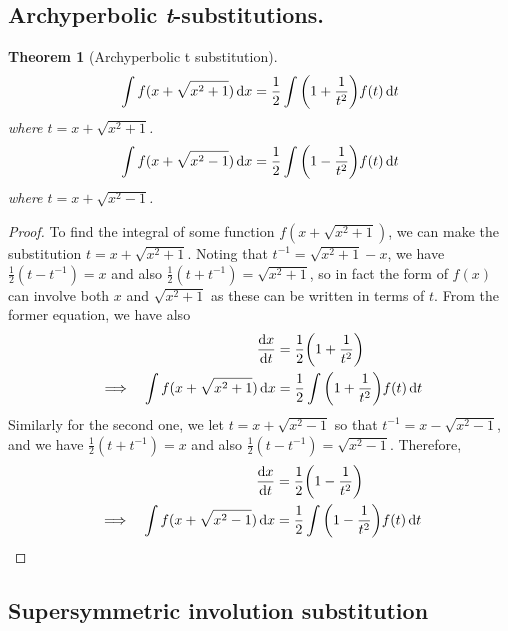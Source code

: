 \documentclass[fleqn,a4paper,11pt]{article}
\newtheorem{theorem}{Theorem}[section]
\begin{document}
    \subsection{Archyperbolic \textit t-substitutions.}

    \begin{theorem}[Archyperbolic t substitution]
    \begin{equation*}
    \int f(x + \sqrt{x^2 + 1}) \dd{x}
        = \frac 12 \int \pqty{1 + \frac 1{t^2}}f(t) \dd{t}
    \end{equation*}
    where \(t = x + \sqrt{x^2 + 1}\).
    \begin{equation*}
    \int f(x + \sqrt{x^2 - 1}) \dd{x}
        = \frac 12 \int \pqty{1 - \frac 1{t^2}}f(t) \dd{t}
    \end{equation*}
    where \(t = x + \sqrt{x^2 - 1}\).
    \end{theorem}
    \begin{proof}
    To find the integral of some function \(f(x + \sqrt{x^2 + 1})\), we can make
    the substitution \(t = x + \sqrt{x^2 + 1}\). Noting that
    \(t^{-1} = \sqrt{x^2 + 1} - x\), we have \(\frac 12(t - t^{-1}) = x\)
    and also \(\frac 12(t + t^{-1}) = \sqrt{x^2 + 1}\), so in fact the form of
    \(f(x)\) can involve both \(x\) and \(\sqrt{x^2 + 1}\) as these can be
    written in terms of \(t\). From the former equation, we have also
    \begin{alignat*}{2}
    && \dv{x}{t} &= \frac 12\pqty{1 + \frac 1{t^2}} \\
    &\implies& \int f(x + \sqrt{x^2 + 1}) \dd{x}
        &= \frac 12 \int \pqty{1 + \frac 1{t^2}}f(t) \dd{t}
    \end{alignat*}
    Similarly for the second one, we let \(t = x + \sqrt{x^2 - 1}\) so that
    \(t^{-1} = x - \sqrt{x^2 - 1}\), and we have \(\frac 12(t + t^{-1}) = x\)
    and also \(\frac 12(t - t^{-1}) = \sqrt{x^2 - 1}\). Therefore,
    \begin{alignat*}{2}
    && \dv{x}{t} &= \frac 12\pqty{1 - \frac 1{t^2}} \\
    &\implies& \int f(x + \sqrt{x^2 - 1}) \dd{x}
        &= \frac 12 \int \pqty{1 - \frac 1{t^2}}f(t) \dd{t} \qedhere
    \end{alignat*}
    \end{proof}

    \subsection{Supersymmetric involution substitution}
\end{document}
